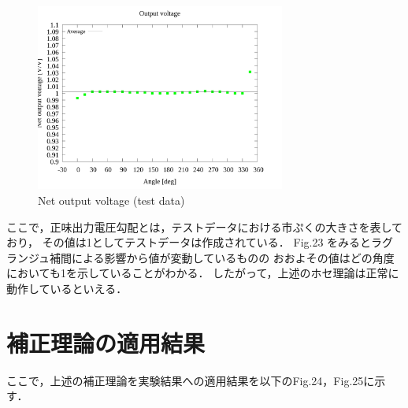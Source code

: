 \documentclass[twocolumn,a4j]{jsarticle}
\begin{document}
\begin{figure}[htbp]
    \footnotesize
    \begin{center}
        \includegraphics[width=82mm]{../../../02_workspace/result/simulation_tx=10.0_ty=-5.0_dx=5.00_dy=-2.50/plot/09/09_summary-outputvoltage-net.png}
        \caption{Net output voltage (test data)}
    \end{center}
\end{figure}

\newpage


ここで，正味出力電圧勾配とは，テストデータにおける市ぷくの大きさを表しており，
その値は1としてテストデータは作成されている．
Fig.23 をみるとラグランジュ補間による影響から値が変動しているものの
おおよその値はどの角度においても1を示していることがわかる．
したがって，上述のホセ理論は正常に動作しているといえる．

\section{補正理論の適用結果}

ここで，上述の補正理論を実験結果への適用結果を以下のFig.24，Fig.25に示す．
\end{document}
